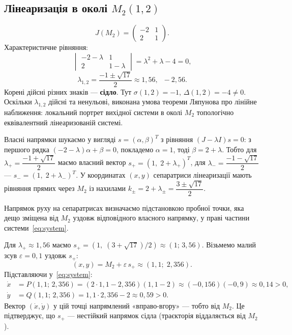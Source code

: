 \documentclass[12pt,a4paper]{article}
\begin{document}
\subsection{Лінеаризація в околі $M_2(1,2)$}

\begin{equation*}
J(M_2)=
\begin{pmatrix}
-2 & 1\\
2 & 1
\end{pmatrix}.
\end{equation*}
Характеристичне рівняння:
\begin{equation*}
\begin{vmatrix}
-2-\lambda & 1\\
2 & 1-\lambda
\end{vmatrix}
=\lambda^2+\lambda-4=0,
\end{equation*}
\begin{equation*}
\lambda_{1,2}=\frac{-1\pm\sqrt{17}}{2}\approx 1{,}56,\;\; -2{,}56.
\end{equation*}
Корені дійсні різних знаків --- \textbf{сідло}. Тут $\sigma(1,2)=-1$, $\Delta(1,2)=-4\neq 0$.
Оскільки $\lambda_{1,2}$ дійсні та ненульові, виконана умова теореми Ляпунова про лінійне наближення: локальний портрет вихідної системи в околі $M_2$ топологічно еквівалентний лінеаризованій системі.

Власні напрямки шукаємо у вигляді $s=(\alpha,\beta)^T$ з рівняння $(J-\lambda I)s=0$: з першого рядка $(-2-\lambda)\alpha+\beta=0$, покладемо $\alpha=1$, тоді $\beta=2+\lambda$.
Тобто для $\lambda_+=\dfrac{-1+\sqrt{17}}{2}$ маємо власний вектор $s_+=(1,\;2+\lambda_+)^T$, для $\lambda_-=\dfrac{-1-\sqrt{17}}{2}$ --- $s_-=(1,\;2+\lambda_-)^T$.
У координатах $(x,y)$ сепаратриси лінеаризації мають рівняння прямих через $M_2$ із нахилами $k_\pm = 2+\lambda_\pm = \dfrac{3\pm\sqrt{17}}{2}$.

Напрямок руху на сепаратрисах визначаємо підстановкою пробної точки, яка дещо зміщена від $M_2$ уздовж відповідного власного напрямку, у праві частини системи~\eqref{eq:system}.

Для $\lambda_+\approx 1{,}56$ маємо $s_+=(1,\;(3+\sqrt{17})/2)\approx(1;\,3{,}56)$. Візьмемо малий зсув $\varepsilon=0{,}1$ уздовж $s_+$:
\begin{equation*}
(x,y)=M_2+\varepsilon\,s_+\approx(1{,}1;\;2{,}356).
\end{equation*}
Підставляючи у~\eqref{eq:system}:
\begin{align*}
\dot x &= P(1{,}1;\,2{,}356)=(2{\cdot}1{,}1-2{,}356)(1{,}1-2)\approx(-0{,}156)(-0{,}9)\approx 0{,}14>0,\\
\dot y &= Q(1{,}1;\,2{,}356)=1{,}1{\cdot}2{,}356-2\approx 0{,}59>0.
\end{align*}
Вектор $(\dot x,\dot y)$ у цій точці напрямлений «вправо-вгору» --- тобто від $M_2$. Це підтверджує, що $s_+$ --- нестійкий напрямок сідла (траєкторія віддаляється від $M_2$).
\end{document}
